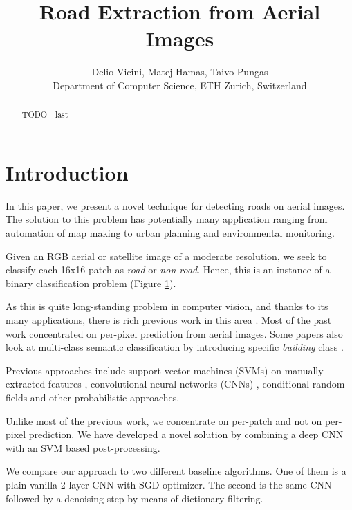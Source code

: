\documentclass[10pt,conference,compsocconf]{IEEEtran}
\begin{document}
\title{Road Extraction from Aerial Images}
\author{
  Delio Vicini, Matej Hamas, Taivo Pungas\\
  Department of Computer Science, ETH Zurich, Switzerland
}

\maketitle

\begin{abstract}
  TODO - last
\end{abstract}

\section{Introduction}
\label{sec:intro}

In this paper, we present a novel technique for detecting roads on aerial images. The solution to this problem has potentially many application ranging from automation of map making to urban planning and environmental monitoring.

Given an RGB aerial or satellite image of a moderate resolution, we seek to classify each 16x16 patch as \textit{road} or \textit{non-road}. Hence, this is an instance of a binary classification problem (Figure \ref{sec:intro}).

As this is quite long-standing problem in computer vision, and thanks to its many applications, there is rich previous work in this area \cite{Huang.2002} \cite{MnihThesis.2013} \cite{Long.2014} \cite{Montoya.2015} \cite{Saito.2015}. Most of the past work concentrated on per-pixel prediction from aerial images. Some papers also look at multi-class semantic classification by introducing specific \textit{building} class \cite{Saito.2015}. 

Previous approaches include support vector machines (SVMs) on manually extracted features \cite{Huang.2002}, convolutional neural networks (CNNs) \cite{Long.2014} \cite{Saito.2015}, conditional random fields \cite{Montoya.2015} and other probabilistic approaches.

Unlike most of the previous work, we concentrate on per-patch and not on per-pixel prediction. We have developed a novel solution by combining a deep CNN with an SVM based post-processing.

We compare our approach to two different baseline algorithms. One of them is a plain vanilla 2-layer CNN with SGD optimizer. The second is the same CNN followed by a denoising step by means of dictionary filtering.
\end{document}
